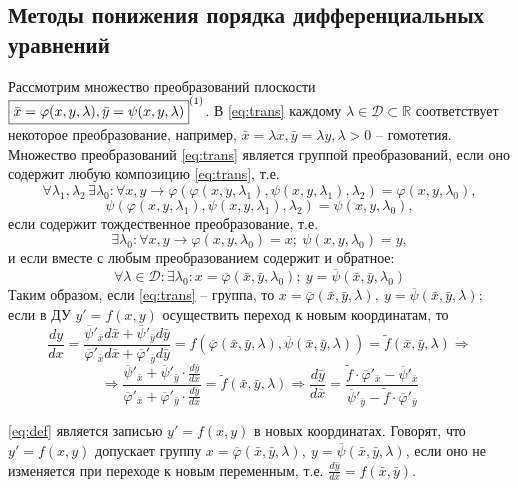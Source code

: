 \subsection{Методы понижения порядка дифференциальных уравнений}
\begin{proposition}

    Рассмотрим множество преобразований плоскости \\ $ \boxed{\bar{x} = \varphi(x, y, \lambda), \bar{y} = \psi (x, y, \lambda)}^{\eqnum\label{eq:trans}} $. В \eqref{eq:trans} каждому $ \lambda \in \mathcal{ D }  \subset \mathbb{ R } $ соответствует некоторое преобразование, например, $ \bar{x} = \lambda x, \bar{y} = \lambda y, \lambda > 0 $ -- гомотетия. Множество преобразований \eqref{eq:trans}  является группой преобразований, если оно содержит любую композицию \eqref{eq:trans}, т.е. 
    \[ \forall \lambda_1, \lambda_2 \, \exists \lambda_0 : \forall x, y \rightarrow \varphi(\varphi(x, y, \lambda_1), \psi(x, y, \lambda_1), \lambda_2) = \varphi(x, y, \lambda_0),\]
    \[ \psi(\varphi(x, y, \lambda_1), \psi(x, y, \lambda_1), \lambda_2) = \psi(x, y, \lambda_0),\]
    если содержит тождественное преобразование, т.е. 
    \[ \exists \lambda_0: \forall x, y \rightarrow \varphi(x, y, \lambda_0) = x; \ \psi(x, y, \lambda_0) = y,\]
    и если вместе с любым преобразованием содержит и обратное: 
    \[ \forall \lambda \in \mathcal{D} \colon \exists \lambda_0 \colon x = \overline{\varphi}  (\bar{x}, \bar{y}, \lambda_0); \ y = \overline{\psi} (\bar{x}, \bar{y}, \lambda_0) \]
    Таким образом, если \eqref{eq:trans} -- группа, то $ x = \overline{\varphi} (\bar{x}, \bar{y}, \lambda), \ y = \overline{\psi}  (\bar{x}, \bar{y}, \lambda);$ если в ДУ $ y' = f(x, y)$ осуществить переход к новым координатам, то \\
    $$
    \frac{dy}{dx} = \frac{ \overline{\psi}'_{ \bar{x} } d\bar{x} +  \overline{\psi}'_{ \bar{y} } d\bar{y} }{ \overline{\varphi}'_{\bar{x}} d\bar{x} + \overline{\varphi}'_{\bar{y}} d\bar{y}} = f(\overline{ \varphi }(\bar{x}, \bar{y}, \lambda), \overline{ \psi }(\bar{x}, \bar{y}, \lambda)) = \tilde{f}(\bar{x}, \bar{y}, \lambda) \Rightarrow
    $$	
    \begin{equation} \label{eq:def}
    \Rightarrow \frac{ \overline{\psi}'_{ \bar{x} } + \overline{\psi}'_{ \bar{y} } \cdot \frac{d\bar{y}}{d\bar{x}} }{ \overline{\varphi}'_{\bar{x}} + \overline{\varphi}'_{\bar{y}} \cdot \frac{d\bar{y}}{d\bar{x}} } = \tilde{f}(\bar{x}, \bar{y}, \lambda) \Rightarrow \frac{d\bar{y}}{d\bar{x}} = \frac{\tilde{f} \cdot  \overline{\varphi}'_{\bar{x}} - \overline{\psi}'_{\bar{x} } }{ \overline{\psi}'_{\bar{y}} - \tilde{f} \cdot \overline{\varphi}'_{\bar{y}}}
    \end{equation}  
    
    \eqref{eq:def} является записью $ y' = f(x, y) $ в новых координатах. Говорят, что $ y' = f(x, y) $ допускает группу $ x = \overline{\varphi} (\bar{x}, \bar{y}, \lambda), \ y =  \overline{\psi} (\bar{x}, \bar{y}, \lambda)$, если оно не изменяется при переходе к новым переменным, т.е. $ \frac{d\bar{y}}{d\bar{x}} = f(\bar{x}, \bar{y}) $.
\end{proposition}

